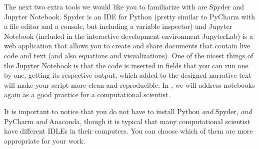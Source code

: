 The next two extra tools we would like you to familiarize with are
Spyder and Jupyter Notebook. Spyder is an IDE for Python (pretty
similar to PyCharm with a file editor and a console, but including a
variable inspector) and Jupyter Notebook (included in the interactive
development environment JupyterLab) is a web application that allows
you to create and share documents that contain live code and text (and
also equations and visualizations).  One of the nicest things of the
Jupyter Notebook is that the code is inserted in fields that you can
run one by one, getting its respective output, which added to the
designed narrative text will make your script more clean and
reproducible. In , we will address notebooks again as a good practice for a computational
scientist.

It is important to notice that you do not have to install Python
\textit{and} Spyder, \textit{and} PyCharm \textit{and} Anaconda,
though it is typical that many computational scientist have different
IDLEs in their computers. You can choose which of them are more
appropriate for your work.
